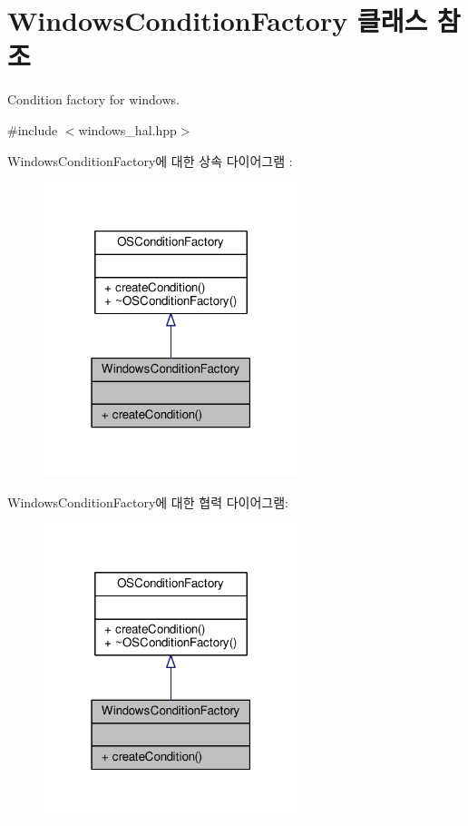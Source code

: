 \hypertarget{class_windows_condition_factory}{}\section{Windows\+Condition\+Factory 클래스 참조}
\label{class_windows_condition_factory}


Condition factory for windows.  




{\ttfamily \#include $<$windows\+\_\+hal.\+hpp$>$}



Windows\+Condition\+Factory에 대한 상속 다이어그램 \+: 
\nopagebreak
\begin{figure}[H]
\begin{center}
\leavevmode
\includegraphics[width=211pt]{class_windows_condition_factory__inherit__graph}
\end{center}
\end{figure}


Windows\+Condition\+Factory에 대한 협력 다이어그램\+:
\nopagebreak
\begin{figure}[H]
\begin{center}
\leavevmode
\includegraphics[width=211pt]{class_windows_condition_factory__coll__graph}
\end{center}
\end{figure}
